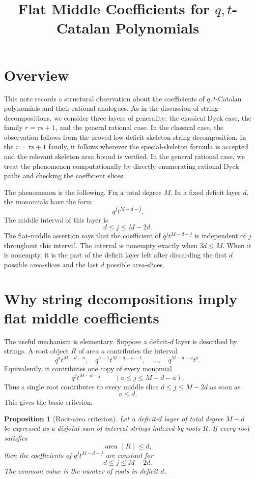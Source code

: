 \documentclass{article}
\title{Flat Middle Coefficients for $q,t$-Catalan Polynomials}
\author{}
\date{}
\DeclareMathOperator{\area}{area}
\newtheorem{proposition}{Proposition}
\begin{document}
\maketitle

\section{Overview}

This note records a structural observation about the coefficients of
\(q,t\)-Catalan polynomials and their rational analogues. As in the discussion
of string decompositions, we consider three layers of generality: the classical
Dyck case, the family \(r=\tau s+1\), and the general rational case. In the
classical case, the observation follows from the proved low-deficit
skeleton-string decomposition. In the \(r=\tau s+1\) family, it follows
wherever the special-skeleton formula is accepted and the relevant skeleton
area bound is verified. In the general rational case, we treat the phenomenon
computationally by directly enumerating rational Dyck paths and checking the
coefficient slices.

The phenomenon is the following. Fix a total degree \(M\).  In a fixed deficit
layer \(d\), the monomials have the form
\[
  q^j t^{M-d-j}.
\]
The middle interval of this layer is
\[
  d\le j\le M-2d.
\]
The flat-middle assertion says that the coefficient of
\(q^j t^{M-d-j}\) is independent of \(j\) throughout this interval.  The
interval is nonempty exactly when \(3d\le M\).  When it is nonempty, it is the
part of the deficit layer left after discarding the first \(d\) possible
area-slices and the last \(d\) possible area-slices.

\section{Why string decompositions imply flat middle coefficients}

The useful mechanism is elementary.  Suppose a deficit-\(d\) layer is described
by strings.  A root object \(R\) of area \(a\) contributes the interval
\[
  q^a t^{M-d-a},\quad
  q^{a+1}t^{M-d-a-1},\quad\ldots,\quad
  q^{M-d-a}t^a.
\]
Equivalently, it contributes one copy of every monomial
\[
  q^j t^{M-d-j}
  \qquad(a\le j\le M-d-a).
\]
Thus a single root contributes to every middle slice
\(d\le j\le M-2d\) as soon as
\[
  a\le d.
\]
This gives the basic criterion.

\begin{proposition}[Root-area criterion]
Let a deficit-\(d\) layer of total degree \(M-d\) be expressed as a disjoint
sum of interval strings indexed by roots \(R\).  If every root satisfies
\[
  \area(R)\le d,
\]
then the coefficients of \(q^j t^{M-d-j}\) are constant for
\[
  d\le j\le M-2d.
\]
The common value is the number of roots in deficit \(d\).
\end{proposition}
\end{document}
